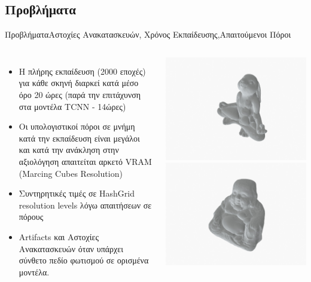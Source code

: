 \documentclass[10pt]{beamer}
\begin{document}
\subsection{Προβλήματα}
\begin{frame}{Προβλήματα}{Αστοχίες Ανακατασκευών, Χρόνος Εκπαίδευσης,Απαιτούμενοι Πόροι }
\begin{columns}
    \begin{itemize}
    \item Η πλήρης εκπαίδευση (2000 εποχές) για κάθε σκηνή διαρκεί κατά μέσο όρο 20 ώρες (παρά την επιτάχυνση στα μοντέλα TCNN - 14ώρες)
    \item Οι υπολογιστικοί πόροι σε μνήμη κατά την εκπαίδευση είναι μεγάλοι και κατά την ανάκληση στην αξιολόγηση απαιτείται αρκετό VRAM (Marcing Cubes Resolution)
    \item Συντηρητικές τιμές σε HashGrid resolution levels 
    λόγω απαιτήσεων σε πόρους
    \item Artifacts και Αστοχίες Ανακατασκευών όταν υπάρχει σύνθετο πεδίο φωτισμού σε ορισμένα μοντέλα.
    \end{itemize}
    \includegraphics[height=.25\textheight]{images/110_bad.jpg}\\
    \includegraphics[height=.25\textheight]{images/114_2000.jpg}\\

\end{columns}
\end{frame}
\end{document}
